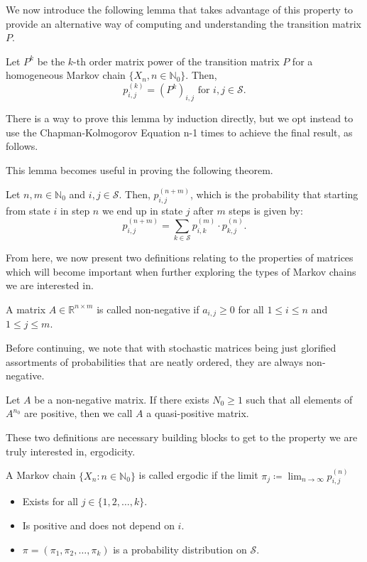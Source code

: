 We now introduce the following lemma that takes advantage of this property to provide an alternative way of computing and understanding the transition matrix $P$. 

\begin{lemma}
	Let $P^k$ be the $k$-th order matrix power of the transition matrix $P$ for a homogeneous Markov chain $\{ X_n, n \in \mathbb{N}_0 \}$. Then, 
	\[ p_{i,j}^{(k)} = (P^k)_{i,j} \text{ for } i,j \in \mathcal{S}. \]
\end{lemma}

There is a way to prove this lemma by induction directly, but we opt instead to use the Chapman-Kolmogorov Equation n-1 times to achieve the final result, as follows. 

This lemma becomes useful in proving the following theorem. 

\begin{theorem}
	Let $n,m \in \mathbb{N}_0$ and $i,j \in \mathcal{S}$. Then, $p_{i,j}^{(n+m)}$, which is the probability that starting from state $i$ in step $n$ we end up in state $j$ after $m$ steps is given by: 
	\[ p_{i,j}^{(n+m)} = \sum_{k \in \mathcal{S}} p_{i,k}^{(m)} \cdot p_{k,j}^{(n)}. \]
\end{theorem}

From here, we now present two definitions relating to the properties of matrices which will become important when further exploring the types of Markov chains we are interested in. 

\begin{definition}
	A matrix $A \in \mathbb{R}^{n \times m}$ is called non-negative if $a_{i,j} \geq 0$ for all $1 \leq i \leq n$ and $1 \leq j \leq m$. 
\end{definition}

Before continuing, we note that with stochastic matrices being just glorified assortments of probabilities that are neatly ordered, they are always non-negative. 

\begin{definition}
	Let $A$ be a non-negative matrix. If there exists $N_0 \geq 1$ such that all elements of $A^{n_0}$ are positive, then we call $A$ a quasi-positive matrix. 
\end{definition}

These two definitions are necessary building blocks to get to the property we are truly interested in, ergodicity. 

\begin{definition}
	A Markov chain $\{ X_n: n \in \mathbb{N}_0 \}$ is called ergodic if the limit $\pi_j \coloneqq \lim_{n \rightarrow \infty} p_{i,j}^{(n)}$
	\begin{itemize}
		\item Exists for all $j \in \{1,2,\ldots,k\}$. 
		\item Is positive and does not depend on $i$. 
		\item $\pi = (\pi_1 , \pi_2 , \ldots , \pi_k)$ is a probability distribution on $\mathcal{S}$. 
	\end{itemize}
\end{definition}


